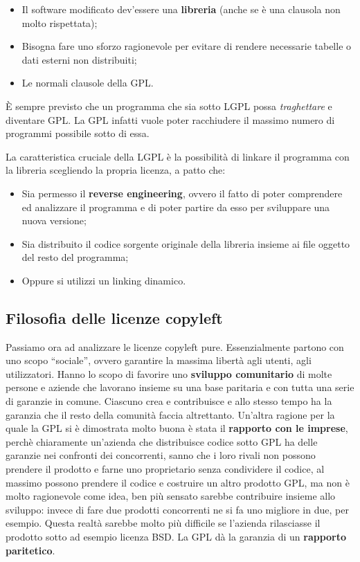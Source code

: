 \begin{itemize}

\item Il software modificato dev'essere una \textbf{libreria} (anche se è una clausola non molto rispettata);
\item Bisogna fare uno sforzo ragionevole per evitare di rendere necessarie tabelle o dati esterni non distribuiti;
\item Le normali clausole della GPL.

\end{itemize}

È sempre previsto che un programma che sia sotto LGPL possa \textit{traghettare} e diventare GPL. La GPL infatti vuole poter racchiudere il massimo numero di programmi possibile sotto di essa.

La caratteristica cruciale della LGPL è la possibilità di linkare il programma con la libreria scegliendo la propria licenza, a patto che:

\begin{itemize}

\item Sia permesso il \textbf{reverse engineering}, ovvero il fatto di poter comprendere ed analizzare il programma e di poter partire da esso per sviluppare una nuova versione;
\item Sia distribuito il codice sorgente originale della libreria insieme ai file oggetto del resto del programma;
\item Oppure si utilizzi un linking dinamico.

\end{itemize}

\subsection{Filosofia delle licenze copyleft}

Passiamo ora ad analizzare le licenze copyleft pure. Essenzialmente partono con uno scopo ``sociale'', ovvero garantire la massima libertà agli utenti, agli utilizzatori. Hanno lo scopo di favorire uno \textbf{sviluppo comunitario} di molte persone e aziende che lavorano insieme su una base paritaria e con tutta una serie di garanzie in comune. Ciascuno crea e contribuisce e allo stesso tempo ha la garanzia che il resto della comunità faccia altrettanto. Un'altra ragione per la quale la GPL si è dimostrata molto buona è stata il \textbf{rapporto con le imprese}, perchè chiaramente un'azienda che distribuisce codice sotto GPL ha delle garanzie nei confronti dei concorrenti, sanno che i loro rivali non possono prendere il prodotto e farne uno proprietario senza condividere il codice, al massimo possono prendere il codice e costruire un altro prodotto GPL, ma non è molto ragionevole come idea, ben più sensato sarebbe contribuire insieme allo sviluppo: invece di fare due prodotti concorrenti ne si fa uno migliore in due, per esempio. Questa realtà sarebbe molto più difficile se l'azienda rilasciasse il prodotto sotto ad esempio licenza BSD. La GPL dà la garanzia di un \textbf{rapporto paritetico}. 

